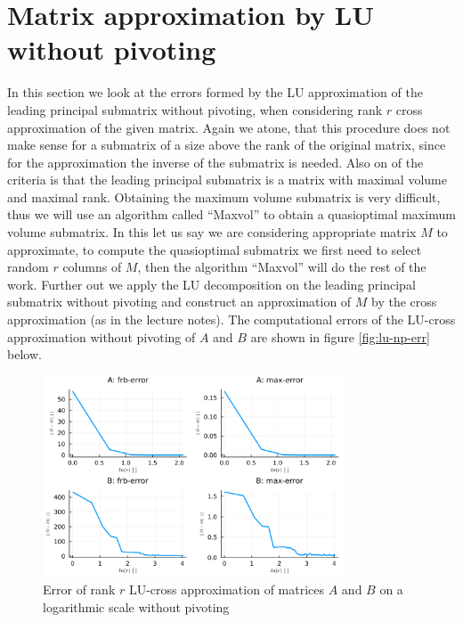 \documentclass[a4paper]{article}
\begin{document}
\section{Matrix approximation by LU without pivoting}
In this section we look at the errors formed by the LU approximation of the
leading principal submatrix without pivoting, when considering rank $r$ cross approximation
of the given matrix. Again we atone, that this procedure does not make sense
for a submatrix of a size above the rank of the original matrix, since for
the approximation the inverse of the submatrix is needed. Also on of the
criteria is that the leading principal submatrix is a matrix with maximal
volume and maximal rank. Obtaining the maximum volume submatrix is very
difficult\cite{survey}, thus we will use an algorithm called ``Maxvol''
\cite{maxvol} to obtain a quasioptimal maximum volume submatrix. In this
let us say we are considering appropriate matrix $M$ to approximate, to
compute the quasioptimal submatrix we first need to select random $r$ columns
of $M$, then the algorithm ``Maxvol'' will do the rest of the work. Further out
we apply the LU decomposition on the leading principal submatrix without
pivoting and construct an approximation of $M$ by the cross approximation (as
in the lecture notes). The computational errors of the LU-cross approximation
without pivoting of $A$ and $B$ are shown in figure \ref{fig:lu-np-err}
below.
\begin{figure}[H]
    \centering
    \includegraphics[width=0.8\textwidth]{plots/lu-np-err.png}
    \caption{\label{fig:svd-err}Error of rank $r$ LU-cross approximation
    of matrices $A$ and $B$ on a logarithmic scale without pivoting}
\end{figure}
\end{document}
